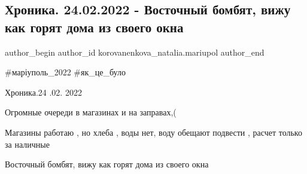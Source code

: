  
 
 
 
 

\subsection{Хроника. 24.02.2022 - Восточный бомбят, вижу как горят дома из своего окна}
\label{sec:24_02_2023.fb.korovanenkova_natalia.mariupol.1.khronika__24_02_2022}

\ifcmt
 author_begin
   author_id korovanenkova_natalia.mariupol
 author_end
\fi

\#маріуполь\_2022 \#як\_це\_було

Хроника.24 .02. 2022

Огромные очереди  в магазинах и на заправах,(

Магазины работаю , но хлеба , воды нет, воду обещают подвести , расчет только за наличные

Восточный  бомбят, вижу как горят дома из своего окна

